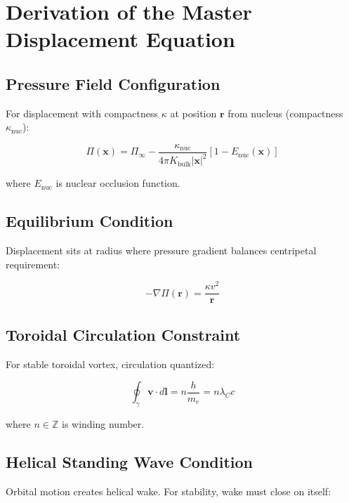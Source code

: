\section{Derivation of the Master Displacement Equation}

\subsection{Pressure Field Configuration}

For displacement with compactness $\kappa$ at position $\mathbf{r}$ from nucleus (compactness $\kappa_{\text{nuc}}$):

\begin{equation}
\Pi(\mathbf{x}) = \Pi_\infty - \frac{\kappa_{\text{nuc}}}{4\pi K_{\text{bulk}} |\mathbf{x}|^2} [1 - E_{\text{nuc}}(\mathbf{x})]
\label{eq:nuclear_pressure}
\end{equation}

where $E_{\text{nuc}}$ is nuclear occlusion function.

\subsection{Equilibrium Condition}

Displacement sits at radius where pressure gradient balances centripetal requirement:

\begin{equation}
-\nabla \Pi(\mathbf{r}) = \frac{\kappa v^2}{\mathbf{r}}
\label{eq:equilibrium}
\end{equation}

\subsection{Toroidal Circulation Constraint}

For stable toroidal vortex, circulation quantized:

\begin{equation}
\oint_{\gamma} \mathbf{v} \cdot d\mathbf{l} = n \frac{h}{m_e} = n \lambda_C c
\label{eq:circulation}
\end{equation}

where $n \in \mathbb{Z}$ is winding number.

\subsection{Helical Standing Wave Condition}

Orbital motion creates helical wake. For stability, wake must close on itself:

